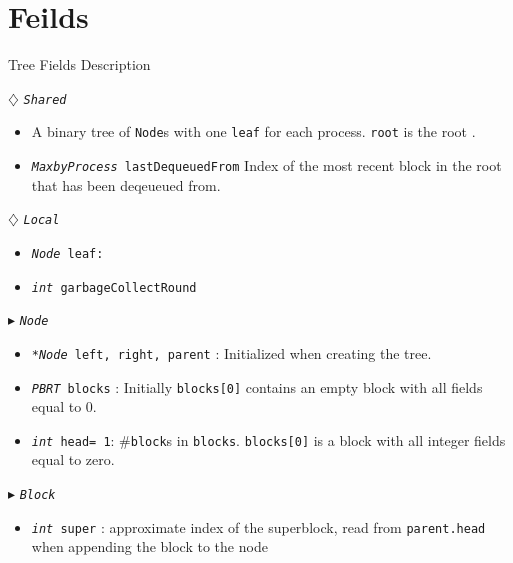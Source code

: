 \documentclass{article}
\renewcommand{\tt}[1]{\texttt{#1}}
\renewcommand{\sl}[1]{\textsl{#1}}
\newcommand{\nf}[1]{{\normalfont{\texttt{#1}}}}
\newcommand{\head}{head}
\theoremstyle{definition}
\begin{document}
\section{Feilds}
\begin{algorithm}
\caption{Tree Fields Description}
\begin{algorithmic}[1]
\setcounter{ALG@line}{1}


\Statex $\diamondsuit$ \tt{\sl{Shared}}
\begin{itemize}
\item \textsf{A binary tree of \tt{Node}s with one \tt{leaf} for each process. \tt{root} is the root \nf{node}.}
\item {\color{red}\tt{\sl{MaxbyProcess} lastDequeuedFrom} \textsf{Index of the most recent block in the root that has been deqeueued from.}}
\end{itemize}

\Statex $\diamondsuit$ \tt{\sl{Local}}
\begin{itemize}
\item \tt{\sl{Node} leaf:} 
\item {\color{red}\tt{\sl{int} garbageCollectRound}}
\end{itemize}

\Statex $\blacktriangleright$ \tt{\sl{Node}}
\begin{itemize}
\item \tt{\sl{*Node} left, right, parent} \textsf{: Initialized  when creating the tree.}
\item {\color{red}\tt{\sl{PBRT} blocks} \textsf{: Initially \tt{blocks[0]} contains an empty block with all fields equal to 0.}}
\item \tt{\sl{int} \head= 1}\textsf{: \#\tt{block}s in \tt{blocks}. \tt{blocks[0]} is a block with all integer fields equal to zero.}
\end{itemize}

\Statex $\blacktriangleright$ \tt{\sl{Block}} 

\begin{itemize}
  \item \tt{\sl{int} super}
  \textsf{: approximate index of the superblock, read from \tt{parent.head} when appending the block to the node}
\end{itemize}




\end{algorithmic}
\end{algorithm}
\end{document}
